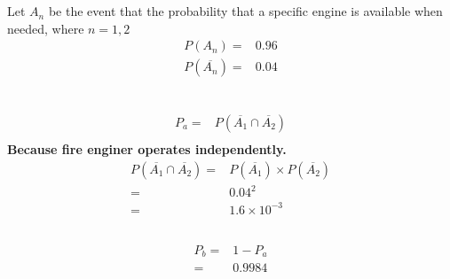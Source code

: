 \documentclass{article}
\begin{document}
    \section{}
        Let $A_n$ be  the event that the probability that a specific engine is available when needed, where $n=1,2$
        \begin{equation*}
            \begin{split}
                P(A_n)=&0.96\\
                P(\overline{A_n})=&0.04\\
            \end{split}
        \end{equation*}
        \subsection{}
            \paragraph{
                \begin{equation*}
                    \begin{split}
                        P_a=&P(\overline{A_1}\cap \overline{A_2})\\
                    \end{split}
                \end{equation*}
                Because fire enginer operates independently.
                \begin{equation*}
                    \begin{split}
                        P(\overline{A_1}\cap \overline{A_2})=&P(\overline{A_1})\times P(\overline{A_2})\\
                        =&0.04^2\\
                        =&1.6\times 10^{-3}
                    \end{split}
                \end{equation*}
            }
        \subsection{}
            \paragraph{
                \begin{equation*}
                    \begin{split}
                        P_b=&1-P_a\\
                        =&0.9984\\
                    \end{split}
                \end{equation*}
            }
\end{document}
